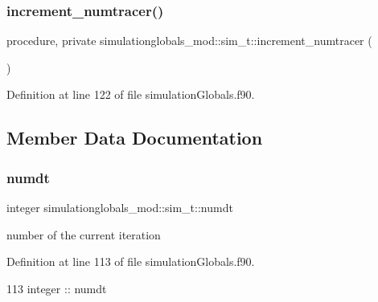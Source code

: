 \subsubsection{\texorpdfstring{increment\+\_\+numtracer()}{increment\_numtracer()}}
{\footnotesize\ttfamily procedure, private simulationglobals\+\_\+mod\+::sim\+\_\+t\+::increment\+\_\+numtracer (\begin{DoxyParamCaption}{ }\end{DoxyParamCaption})\hspace{0.3cm}{\ttfamily [private]}}



Definition at line 122 of file simulation\+Globals.\+f90.



\subsection{Member Data Documentation}
\mbox{\label{structsimulationglobals__mod_1_1sim__t_acf2dd4822ebd48541ac6d018038b286a}} 
\subsubsection{\texorpdfstring{numdt}{numdt}}
{\footnotesize\ttfamily integer simulationglobals\+\_\+mod\+::sim\+\_\+t\+::numdt\hspace{0.3cm}{\ttfamily [private]}}



number of the current iteration 



Definition at line 113 of file simulation\+Globals.\+f90.


\begin{DoxyCode}
113         \textcolor{keywordtype}{integer} :: numdt
\end{DoxyCode}
\mbox{\label{structsimulationglobals__mod_1_1sim__t_a5ae529652641c13a5471697d84b5db77}} 

